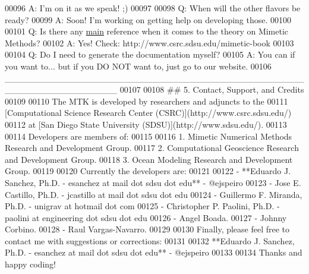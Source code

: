 \begin{DoxyCode}
00096 A: I\textcolor{stringliteral}{'m on it as we speak! ;)}
00097 \textcolor{stringliteral}{}
00098 \textcolor{stringliteral}{Q: When will the other flavors be ready?}
00099 \textcolor{stringliteral}{A: Soon! I'}m working on getting help on developing those.
00100 
00101 Q: Is there any \hyperlink{poisson__1d_8cc_ae66f6b31b5ad750f1fe042a706a4e3d4}{main} reference when it comes to the theory on Mimetic Methods?
00102 A: Yes! Check: http:\textcolor{comment}{//www.csrc.sdsu.edu/mimetic-book}
00103 
00104 Q: Do I need to generate the documentation myself?
00105 A: You can \textcolor{keywordflow}{if} you want to... but \textcolor{keywordflow}{if} you DO NOT want to, just go to our website.
00106     \_\_\_\_\_\_\_\_\_\_\_\_\_\_\_\_\_\_\_\_\_\_\_\_\_\_\_\_\_\_\_\_\_\_\_\_\_\_\_\_\_\_\_\_\_\_\_\_\_\_\_\_\_\_\_\_\_\_\_\_\_\_\_\_\_\_
00107 
00108 \textcolor{preprocessor}{## 5. Contact, Support, and Credits}
00109 \textcolor{preprocessor}{}
00110 The MTK is developed by researchers and adjuncts to the
00111 [Computational Science Research Center (CSRC)](http:\textcolor{comment}{//www.csrc.sdsu.edu/)}
00112 at [San Diego State University (SDSU)](http:\textcolor{comment}{//www.sdsu.edu/).}
00113 
00114 Developers are members of:
00115 
00116 1. Mimetic Numerical Methods Research and Development Group.
00117 2. Computational Geoscience Research and Development Group.
00118 3. Ocean Modeling Research and Development Group.
00119 
00120 Currently the developers are:
00121 
00122 - **Eduardo J. Sanchez, Ph.D. - esanchez at mail dot sdsu dot edu** - @ejspeiro
00123 - Jose E. Castillo, Ph.D. - jcastillo at mail dot sdsu dot edu
00124 - Guillermo F. Miranda, Ph.D. - unigrav at hotmail dot com
00125 - Christopher P. Paolini, Ph.D. - paolini at engineering dot sdsu dot edu
00126 - Angel Boada.
00127 - Johnny Corbino.
00128 - Raul Vargas-Navarro.
00129 
00130 Finally, please feel free to contact me with suggestions or corrections:
00131 
00132 **Eduardo J. Sanchez, Ph.D. - esanchez at mail dot sdsu dot edu** - @ejspeiro
00133 
00134 Thanks and happy coding!
\end{DoxyCode}
